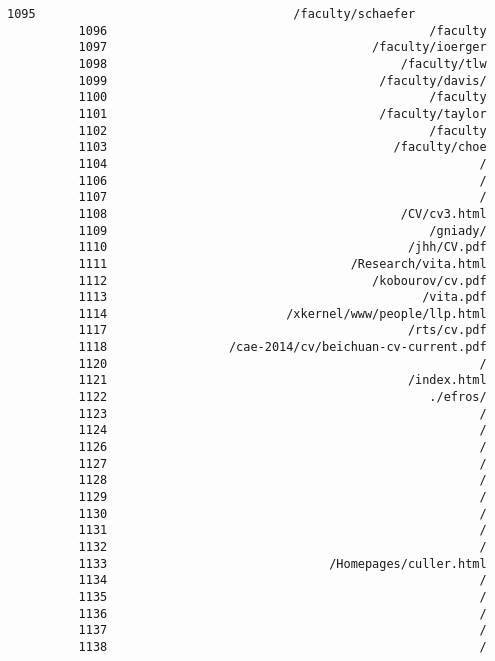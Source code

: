 \documentclass[11pt]{article}
\begin{document}
\begin{Verbatim}[commandchars=\\\{\}]
          1095                                    /faculty/schaefer
          1096                                             /faculty
          1097                                     /faculty/ioerger
          1098                                         /faculty/tlw
          1099                                      /faculty/davis/
          1100                                             /faculty
          1101                                      /faculty/taylor
          1102                                             /faculty
          1103                                        /faculty/choe
          1104                                                    /
          1106                                                    /
          1107                                                    /
          1108                                         /CV/cv3.html
          1109                                             /gniady/
          1110                                          /jhh/CV.pdf
          1111                                  /Research/vita.html
          1112                                     /kobourov/cv.pdf
          1113                                            /vita.pdf
          1114                         /xkernel/www/people/llp.html
          1117                                          /rts/cv.pdf
          1118                 /cae-2014/cv/beichuan-cv-current.pdf
          1120                                                    /
          1121                                          /index.html
          1122                                             ./efros/
          1123                                                    /
          1124                                                    /
          1126                                                    /
          1127                                                    /
          1128                                                    /
          1129                                                    /
          1130                                                    /
          1131                                                    /
          1132                                                    /
          1133                               /Homepages/culler.html
          1134                                                    /
          1135                                                    /
          1136                                                    /
          1137                                                    /
          1138                                                    /

\end{Verbatim}
\end{document}

